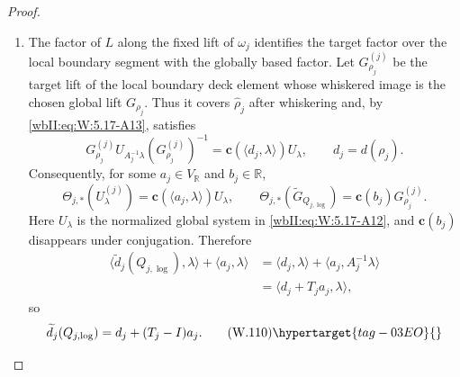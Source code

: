 \begin{proof}
\begin{enumerate}[label={$\langle1\rangle$\arabic*.},leftmargin=*]
\item The factor of \(L\) along the fixed lift of \(\omega_j\) identifies the
target factor over the local boundary segment with the globally based
factor.  Let \(G_{\rho_j}^{(j)}\) be the target lift of the local boundary
deck element whose whiskered image is the chosen global lift
\(G_{\rho_j}\).  Thus it covers \(\widehat\rho_j\) after whiskering and,
by \eqref{wbII:eq:W:5.17-A13}, satisfies
\[
 G_{\rho_j}^{(j)}U_{A_j^{-1}\lambda}(G_{\rho_j}^{(j)})^{-1}
 =\mathbf c(\langle d_j,\lambda\rangle)U_\lambda,
 \qquad d_j=d(\rho_j).
\]
Consequently, for some
\(a_j\in V_{\mathbb R}\) and \(b_j\in\mathbb R\),
\[
 \Theta_{j,*}(U_\lambda^{(j)})
 =\mathbf c(\langle a_j,\lambda\rangle)U_\lambda,
 \qquad
 \Theta_{j,*}(\widetilde G_{Q_{j,\log}})
 =\mathbf c(b_j)G_{\rho_j}^{(j)}.
\]
Here \(U_\lambda\) is the normalized global system in \eqref{wbII:eq:W:5.17-A12}, and
\(\mathbf c(b_j)\) disappears under conjugation.
Therefore
\[
\begin{aligned}
 \langle\widetilde d_j(Q_{j,\log}),\lambda\rangle
 +\langle a_j,\lambda\rangle
 &=\langle d_j,\lambda\rangle
   +\langle a_j,A_j^{-1}\lambda\rangle\\
 &=\langle d_j+T_ja_j,\lambda\rangle,
\end{aligned}
\]
so
\[
 \widetilde d_j(Q_{j,\log})=d_j+(T_j-I)a_j.
\tag{W.110}\hypertarget{tag-03EO}{}\label{wbII:eq:W:5.17-A14e}
\]


\end{enumerate}
\end{proof}
